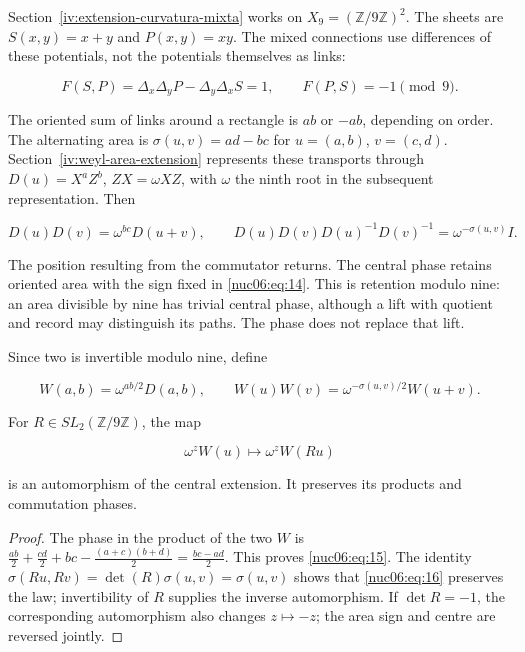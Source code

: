 Section~\ref{iv:extension-curvatura-mixta} works on \(X_9=(\mathbb Z/9\mathbb Z)^2\). The sheets are \(S(x,y)=x+y\) and \(P(x,y)=xy\). The mixed connections use differences of these potentials, not the potentials themselves as links:

\begin{equation}
F(S,P)=\Delta_x\Delta_yP-\Delta_y\Delta_xS=1,
\qquad F(P,S)=-1\pmod9.
\label{nuc06:eq:13}
\end{equation}

The oriented sum of links around a rectangle is \(ab\) or \(-ab\), depending on order. The alternating area is \(\sigma(u,v)=ad-bc\) for \(u=(a,b)\), \(v=(c,d)\). Section~\ref{iv:weyl-area-extension} represents these transports through \(D(u)=X^aZ^b\), \(ZX=\omega XZ\), with \(\omega\) the ninth root in the subsequent representation. Then

\begin{equation}
D(u)D(v)=\omega^{bc}D(u+v),\qquad
D(u)D(v)D(u)^{-1}D(v)^{-1}=\omega^{-\sigma(u,v)}I.
\label{nuc06:eq:14}
\end{equation}

The position resulting from the commutator returns. The central phase retains oriented area with the sign fixed in \eqref{nuc06:eq:14}. This is retention modulo nine: an area divisible by nine has trivial central phase, although a lift with quotient and record may distinguish its paths. The phase does not replace that lift.

\begin{proposition}

Since two is invertible modulo nine, define

\begin{equation}
W(a,b)=\omega^{ab/2}D(a,b),\qquad
W(u)W(v)=\omega^{-\sigma(u,v)/2}W(u+v).
\label{nuc06:eq:15}
\end{equation}

For \(R\in SL_2(\mathbb Z/9\mathbb Z)\), the map

\begin{equation}
\omega^zW(u)\longmapsto\omega^zW(Ru)
\label{nuc06:eq:16}
\end{equation}

is an automorphism of the central extension. It preserves its products and commutation phases.
\end{proposition}

\begin{proof}
The phase in the product of the two \(W\) is
\(\frac{ab}{2}+\frac{cd}{2}+bc-\frac{(a+c)(b+d)}2=\frac{bc-ad}{2}\). This proves \eqref{nuc06:eq:15}. The identity \(\sigma(Ru,Rv)=\det(R)\sigma(u,v)=\sigma(u,v)\) shows that \eqref{nuc06:eq:16} preserves the law; invertibility of \(R\) supplies the inverse automorphism. If \(\det R=-1\), the corresponding automorphism also changes \(z\mapsto-z\); the area sign and centre are reversed jointly.
\end{proof}

